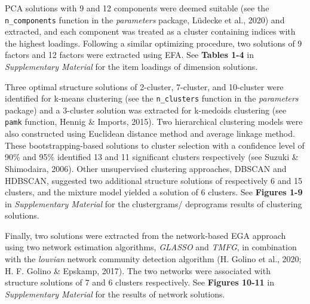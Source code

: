 \documentclass[
  english,
  jou,floatsintext]{apa6}
\begin{document}
PCA solutions with 9 and 12 components were deemed suitable (see the \texttt{n\_components} function in the \emph{parameters} package, Lüdecke et al., 2020) and extracted, and each component was treated as a cluster containing indices with the highest loadings. Following a similar optimizing procedure, two solutions of 9 factors and 12 factors were extracted using EFA. See \textbf{Tables 1-4} in \emph{Supplementary Material} for the item loadings of dimension solutions.

Three optimal structure solutions of 2-cluster, 7-cluster, and 10-cluster were identified for k-means clustering (see the \texttt{n\_clusters} function in the \emph{parameters} package) and a 3-cluster solution was extracted for k-medoids clustering (see \texttt{pamk} function, Hennig \& Imports, 2015). Two hierarchical clustering models were also constructed using Euclidean distance method and average linkage method. These bootstrapping-based solutions to cluster selection with a confidence level of 90\% and 95\% identified 13 and 11 significant clusters respectively (see Suzuki \& Shimodaira, 2006). Other unsupervised clustering approaches, DBSCAN and HDBSCAN, suggested two additional structure solutions of respectively 6 and 15 clusters, and the mixture model yielded a solution of 6 clusters. See \textbf{Figures 1-9} in \emph{Supplementary Material} for the clustergrams/ deprograms results of clustering solutions.

Finally, two solutions were extracted from the network-based EGA approach using two network estimation algorithms, \emph{GLASSO} and \emph{TMFG}, in combination with the \emph{louvian} network community detection algorithm (H. Golino et al., 2020; H. F. Golino \& Epskamp, 2017). The two networks were associated with structure solutions of 7 and 6 clusters respectively. See \textbf{Figures 10-11} in \emph{Supplementary Material} for the results of network solutions.
\end{document}
